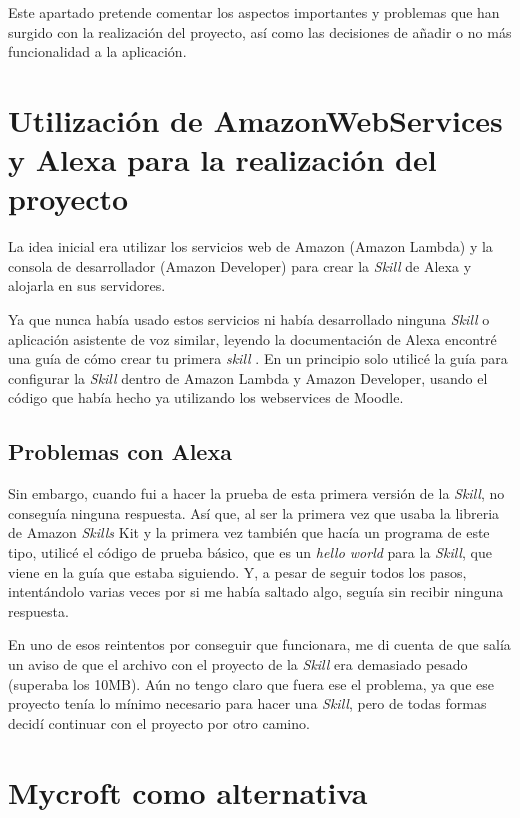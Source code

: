 
Este apartado pretende comentar los aspectos importantes y problemas que han surgido con la realización del proyecto, así como las decisiones de añadir o no más funcionalidad a la aplicación.

\section{Utilización de AmazonWebServices y Alexa para la realización del proyecto}

La idea inicial era utilizar los servicios web de Amazon (Amazon Lambda) y la consola de desarrollador (Amazon Developer) para crear la \textit{Skill} de Alexa y alojarla en sus servidores.

Ya que nunca había usado estos servicios ni había desarrollado ninguna \textit{Skill} o aplicación asistente de voz similar, leyendo la documentación de Alexa encontré una guía de cómo crear tu primera \textit{skill} \cite{DevelopingYourFirst}. En un principio solo utilicé la guía para configurar la \textit{Skill} dentro de Amazon Lambda y Amazon Developer, usando el código que había hecho ya utilizando los webservices de Moodle.

\subsection{Problemas con Alexa}

Sin embargo, cuando fui a hacer la prueba de esta primera versión de la \textit{Skill}, no conseguía ninguna respuesta. Así que, al ser la primera vez que usaba la libreria de Amazon \textit{Skills} Kit y la primera vez también que hacía un programa de este tipo, utilicé el código de prueba básico, que es un \textit{hello world} para la \textit{Skill}, que viene en la guía que estaba siguiendo. Y, a pesar de seguir todos los pasos, intentándolo varias veces por si me había saltado algo, seguía sin recibir ninguna respuesta.

En uno de esos reintentos por conseguir que funcionara, me di cuenta de que salía un aviso de que el archivo con el proyecto de la \textit{Skill} era demasiado pesado (superaba los 10MB). Aún no tengo claro que fuera ese el problema, ya que ese proyecto tenía lo mínimo necesario para hacer una \textit{Skill}, pero de todas formas decidí continuar con el proyecto por otro camino.

\section{Mycroft como alternativa}

